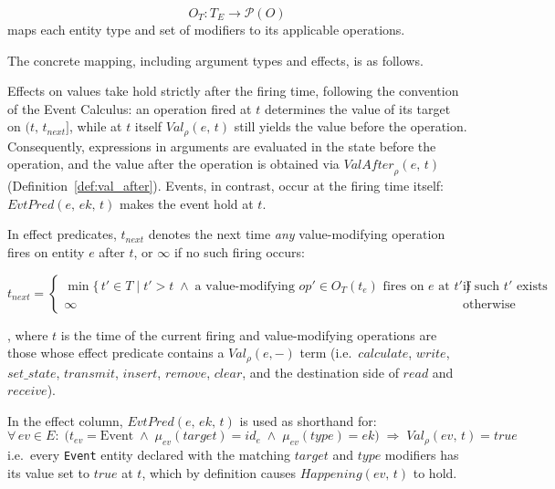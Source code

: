 \begin{definition}\label{def:entity_type_ops_fn}
    \[
        O_T : T_E \rightarrow \mathcal{P}(O)
    \]
    maps each entity type and set of modifiers to its applicable operations.
\end{definition}

The concrete mapping, including argument types and effects, is as follows.

Effects on values take hold strictly after the firing time, following the convention of the Event Calculus: an operation fired at $t$ determines the value of its target on $(t,\, t_{\mathit{next}}]$, while at $t$ itself $\mathit{Val}_\rho(e,\, t)$ still yields the value before the operation.
Consequently, expressions in arguments are evaluated in the state before the operation, and the value after the operation is obtained via $\mathit{ValAfter}_\rho(e,\, t)$ (Definition~\ref{def:val_after}).
Events, in contrast, occur at the firing time itself: $\mathit{EvtPred}(e,\, ek,\, t)$ makes the event hold at $t$.

In effect predicates, $t_{\mathit{next}}$ denotes the next time \emph{any} value-modifying operation fires on entity $e$ after $t$, or $\infty$ if no such firing occurs:

\[
    t_{\mathit{next}} = \begin{cases}
        \min\{\, t' \in T \mid t' > t \;\land\; \text{a value-modifying } op' \in O_T(t_e) \text{ fires on } e \text{ at } t' \,\} & \text{if such } t' \text{ exists} \\
        \infty                                                                                                                     & \text{otherwise}
    \end{cases}
\]

, where $t$ is the time of the current firing and value-modifying operations are those whose effect predicate contains a $\mathit{Val}_\rho(e, -)$ term (i.e.\ $\mathit{calculate}$, $\mathit{write}$, $\mathit{set\_state}$, $\mathit{transmit}$, $\mathit{insert}$, $\mathit{remove}$, $\mathit{clear}$, and the destination side of $\mathit{read}$ and $\mathit{receive}$).

In the effect column, $\mathit{EvtPred}(e,\, ek,\, t)$ is used as shorthand for:
\[
    \forall\, ev \in E :\;
    \bigl(t_{ev} = \text{Event} \;\land\; \mu_{ev}(\mathit{target}) = id_e \;\land\; \mu_{ev}(\mathit{type}) = ek\bigr)
    \;\Rightarrow\; \mathit{Val}_\rho(ev,\, t) = \mathit{true}
\]
i.e.\ every \texttt{Event} entity declared with the matching $\mathit{target}$ and $\mathit{type}$ modifiers has its value set to $\mathit{true}$ at $t$, which by definition causes $\mathit{Happening}(ev,\, t)$ to hold.

